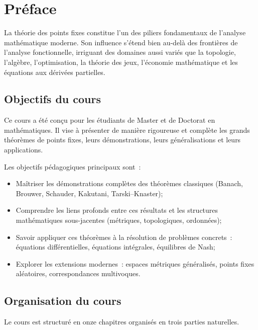 \chapter*{Pr\'eface}

La th\'eorie des points fixes constitue l'un des piliers fondamentaux de l'analyse
math\'ematique moderne. Son influence s'\'etend bien au-del\`a des fronti\`eres de
l'analyse fonctionnelle, irriguant des domaines aussi vari\'es que la topologie,
l'alg\`ebre, l'optimisation, la th\'eorie des jeux, l'\'economie math\'ematique et
les \'equations aux d\'eriv\'ees partielles.

\section*{Objectifs du cours}

Ce cours a \'et\'e con\c{c}u pour les \'etudiants de Master et de Doctorat en
math\'ematiques. Il vise \`a pr\'esenter de mani\`ere rigoureuse et compl\`ete les
grands th\'eor\`emes de points fixes, leurs d\'emonstrations, leurs g\'en\'eralisations
et leurs applications.

Les objectifs p\'edagogiques principaux sont~:
\begin{itemize}
    \item Ma\^itriser les d\'emonstrations compl\`etes des th\'eor\`emes classiques
          (Banach, Brouwer, Schauder, Kakutani, Tarski--Knaster);
    \item Comprendre les liens profonds entre ces r\'esultats et les structures
          math\'ematiques sous-jacentes (m\'etriques, topologiques, ordonn\'ees);
    \item Savoir appliquer ces th\'eor\`emes \`a la r\'esolution de probl\`emes concrets~:
          \'equations diff\'erentielles, \'equations int\'egrales, \'equilibres de Nash;
    \item Explorer les extensions modernes~: espaces m\'etriques g\'en\'eralis\'es,
          points fixes al\'eatoires, correspondances multivoques.
\end{itemize}

\section*{Organisation du cours}

Le cours est structur\'e en onze chapitres organis\'es en trois parties naturelles.

